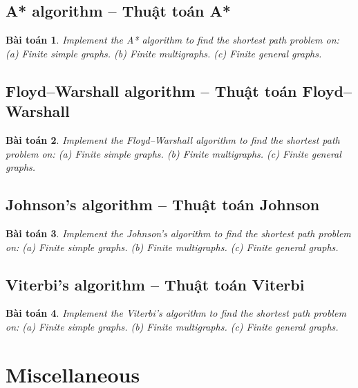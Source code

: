 \documentclass{article}
\newtheorem{baitoan}{Bài toán}
\begin{document}

\subsection{A* algorithm -- Thuật toán A*}

\begin{baitoan}
    Implement the A* algorithm to find the shortest path problem on: (a) Finite simple graphs. (b) Finite multigraphs. (c) Finite general graphs.
\end{baitoan}


\subsection{Floyd--Warshall algorithm -- Thuật toán Floyd--Warshall}

\begin{baitoan}
    Implement the Floyd--Warshall algorithm to find the shortest path problem on: (a) Finite simple graphs. (b) Finite multigraphs. (c) Finite general graphs.
\end{baitoan}


\subsection{Johnson's algorithm -- Thuật toán Johnson}

\begin{baitoan}
    Implement the Johnson's algorithm to find the shortest path problem on: (a) Finite simple graphs. (b) Finite multigraphs. (c) Finite general graphs.
\end{baitoan}


\subsection{Viterbi's algorithm -- Thuật toán Viterbi}

\begin{baitoan}
    Implement the Viterbi's algorithm to find the shortest path problem on: (a) Finite simple graphs. (b) Finite multigraphs. (c) Finite general graphs.
\end{baitoan}


\section{Miscellaneous}


\printbibliography[heading=bibintoc]
\end{document}
